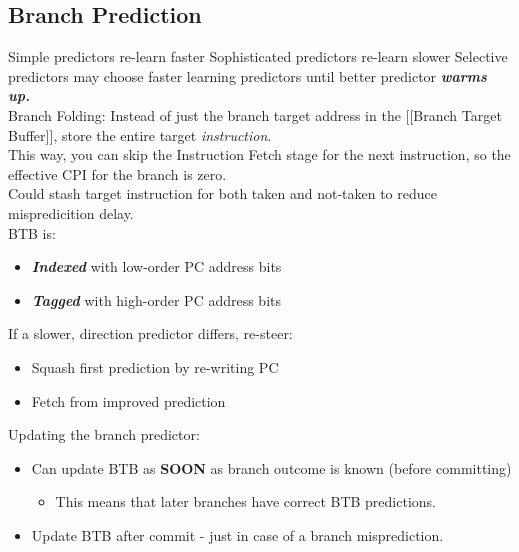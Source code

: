 \documentclass[a4paper, 5pt, twocolumn]{article}
\begin{document}
\setlength{\parindent}{0pt}
\hypertarget{branch-prediction}{%
\subsection{Branch Prediction}\label{branch-prediction}}

Simple predictors re-learn faster Sophisticated predictors re-learn
slower Selective predictors may choose faster learning predictors until
better predictor \textbf{\emph{warms up.}} \\

Branch Folding: Instead of just the branch target address in the
{[}{[}Branch Target Buffer{]}{]}, store the entire target
\emph{instruction}. \\

This way, you can skip the Instruction Fetch stage for the next
instruction, so the effective CPI for the branch is zero. \\

Could stash target instruction for both taken and not-taken to reduce
mispredicition delay. \\

BTB is:
\begin{itemize}[topsep=0pt,itemsep=-1ex,partopsep=1ex,parsep=1ex]
 \item \textbf{\emph{Indexed}} with low-order PC address bits 
 \item \textbf{\emph{Tagged}} with high-order PC address bits \\
\end{itemize} 

If a slower, direction predictor differs, re-steer: 
\begin{itemize}[topsep=0pt,itemsep=-1ex,partopsep=1ex,parsep=1ex]
	\item Squash first prediction by re-writing PC 
	\item Fetch from improved prediction \\
\end{itemize} 

Updating the branch predictor:
\begin{itemize}[topsep=0pt,itemsep=-1ex,partopsep=1ex,parsep=1ex]
	\item Can update BTB as \textbf{SOON} as branch outcome is known (before committing)
	\begin{itemize}[topsep=0pt,itemsep=-1ex,partopsep=1ex,parsep=1ex]
		\item This means that later branches have correct BTB predictions. 
	\end{itemize}
	\item Update BTB after commit - just	in case of a branch misprediction. \\
\end{itemize}
\end{document}
